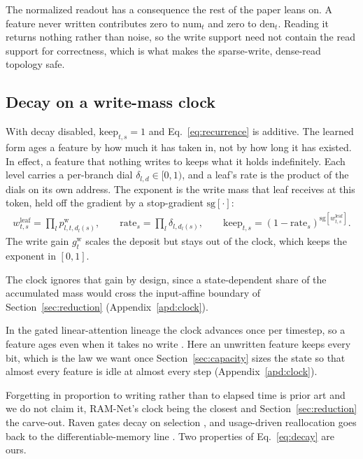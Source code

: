 The normalized readout has a consequence the rest of the paper leans on. A feature never written contributes zero to $\mathrm{num}_t$ and zero to $\mathrm{den}_t$. Reading it returns nothing rather than noise, so the write support need not contain the read support for correctness, which is what makes the sparse-write, dense-read topology safe.

\subsection{Decay on a write-mass clock}
\label{sec:decay}

With decay disabled, $\mathrm{keep}_{t,s} = 1$ and Eq.~\eqref{eq:recurrence} is additive. The learned form ages a feature by how much it has taken in, not by how long it has existed. In effect, a feature that nothing writes to keeps what it holds indefinitely. Each level carries a per-branch dial $\delta_{l,d} \in [0,1)$, and a leaf's rate is the product of the dials on its own address. The exponent is the write mass that leaf receives at this token, held off the gradient by a stop-gradient $\mathrm{sg}[\cdot]$:
\begin{align}
  w^{\mathrm{leaf}}_{t,s} = \prod_{l} p^{\mathrm{w}}_{l,t,d_l(s)},
  \qquad
  \mathrm{rate}_s = \prod_{l} \delta_{l, d_l(s)},
  \qquad
  \mathrm{keep}_{t,s} = \left( 1 - \mathrm{rate}_s \right)^{\mathrm{sg}[ w^{\mathrm{leaf}}_{t,s} ]} .
  \label{eq:decay}
\end{align}
The write gain $g^{\mathrm{w}}_t$ scales the deposit but stays out of the clock, which keeps the exponent in $[0,1]$.

The clock ignores that gain by design, since a state-dependent share of the accumulated mass would cross the input-affine boundary of Section~\ref{sec:reduction} (Appendix~\ref{apd:clock}).

In the gated linear-attention lineage the clock advances once per timestep, so a feature ages even when it takes no write \citep{yang2024gla, gu2023mamba, yang2024gdn, qin2024hgrn2}. Here an unwritten feature keeps every bit, which is the law we want once Section~\ref{sec:capacity} sizes the state so that almost every feature is idle at almost every step (Appendix~\ref{apd:clock}).

Forgetting in proportion to writing rather than to elapsed time is prior art and we do not claim it, RAM-Net's clock being the closest and Section~\ref{sec:reduction} the carve-out. Raven gates decay on selection \citep{afzal2026raven}, and usage-driven reallocation goes back to the differentiable-memory line \citep{graves2016dnc, rae2016sam}. Two properties of Eq.~\eqref{eq:decay} are ours.

